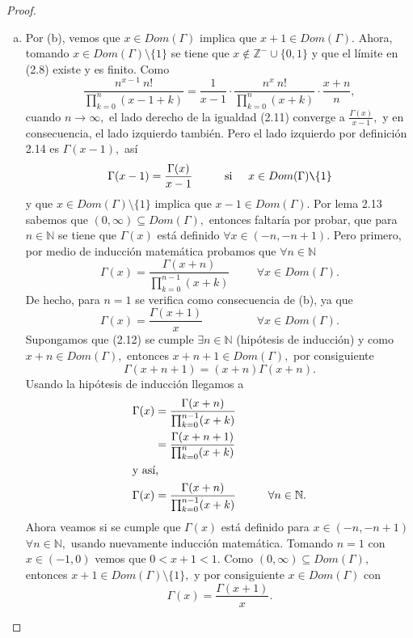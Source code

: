 \begin{proof}
\begin{enumerate}[(a)]
		\item Por (b), vemos que $x \in Dom(\Gamma)$ implica que $x+1 \in Dom(\Gamma).$ Ahora, tomando $x \in Dom(\Gamma)\texttt{\textbackslash}\{1\}$ se tiene que $x \notin \mathbb{Z}^-\cup \{0,1\}$ y que el límite en (2.8) existe y es finito. Como
		\begin{equation}
		\frac{n^{x-1}\ n!}{\prod_{k = 0}^{n}(x-1+k)} = \frac{1}{x-1}\cdot\frac{n^x\ n!}{\prod_{k = 0}^{n}(x+k)}\cdot \frac{x+n}{n},
		\end{equation}
		cuando $n \rightarrow \infty,$ el lado derecho de la igualdad (2.11) converge a $\frac{\Gamma(x)}{x-1},$ y en consecuencia, el lado izquierdo también. Pero el lado izquierdo por definición 2.14 es $\Gamma(x-1),$ así $$\Gamma(x-1) = \frac{\Gamma(x)}{x-1}\hspace{1cm}\textrm{si}\hspace{0.5cm}x \in Dom(\Gamma)\texttt{\textbackslash}\{1\}$$ y que $x \in Dom(\Gamma)\texttt{\textbackslash}\{1\}$ implica que $x-1 \in Dom(\Gamma).$
		Por lema 2.13 sabemos que $(0,\infty)\subseteq Dom(\Gamma),$ entonces faltaría por probar, que para $n \in \mathbb{N}$ se tiene que $\Gamma(x)$ está definido $\forall x \in (-n,-n+1).$ Pero primero, por medio de inducción matemática probamos que $\forall n \in \mathbb{N}$
		\begin{equation}
		\Gamma(x) = \frac{\Gamma(x+n)}{\prod_{k = 0}^{n-1}(x+k)}\hspace{1cm}\forall x \in Dom(\Gamma).
		\end{equation}
		De hecho, para $n = 1$ se verifica como consecuencia de (b), ya que $$\Gamma(x) = \frac{\Gamma(x+1)}{x}\hspace{2cm}\forall x \in Dom(\Gamma).$$ Supongamos que (2.12) se cumple $\exists n \in \mathbb{N}$ (hipótesis de inducción) y como $x+n \in Dom(\Gamma),$ entonces $x+n+1 \in Dom(\Gamma),$ por consiguiente $$\Gamma(x+n+1) = (x+n)\Gamma(x+n).$$
		Usando la hipótesis de inducción llegamos a
		\begin{align*}
		\Gamma(x) &= \frac{\Gamma(x+n)}{\prod_{k = 0}^{n-1}(x+k)}\\
		&= \frac{\Gamma(x+n+1)}{\prod_{k = 0}^{n}(x+k)}\\
		\intertext{y así,}
		\Gamma(x) &= \frac{\Gamma(x+n)}{\prod_{k = 0}^{n-1}(x+k)}\hspace{1cm}\forall n \in \mathbb{N}.
		\end{align*}
		Ahora veamos si se cumple que $\Gamma(x)$ está definido para $x \in (-n,-n+1)$ $\forall n \in \mathbb{N},$ usando nuevamente inducción matemática. Tomando $n = 1$ con $x \in (-1,0)$ vemos que $0 < x+1 < 1.$ Como $(0,\infty)\subseteq Dom(\Gamma),$ entonces $x+1 \in Dom(\Gamma)\texttt{\textbackslash}\{1\},$ y por consiguiente $x \in Dom(\Gamma)$ con $$\Gamma(x) = \frac{\Gamma(x+1)}{x}.$$

\end{enumerate}
\end{proof}

